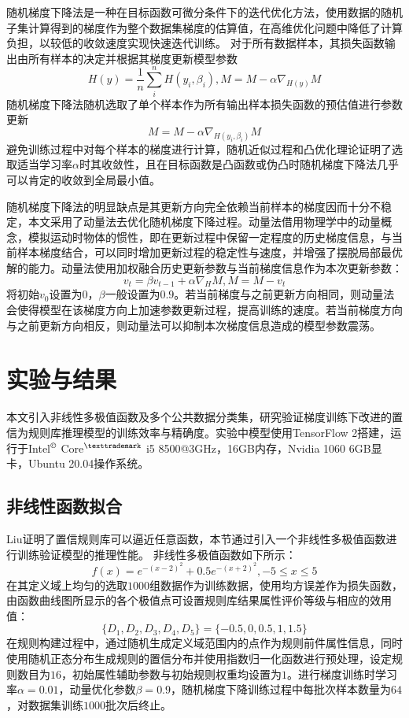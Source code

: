 \documentclass{cjc}
\begin{document}
随机梯度下降法\cite{a17}是一种在目标函数可微分条件下的迭代优化方法，使用数据的随机子集计算得到的梯度作为整个数据集梯度的估算值，在高维优化问题中降低了计算负担，以较低的收敛速度实现快速迭代训练。  
对于所有数据样本，其损失函数输出由所有样本的决定并根据其梯度更新模型参数
$$H(y)=\frac{1}{n}\sum_i^nH(y_i,\beta_i),M=M-\alpha\nabla_{H(y)}M$$
随机梯度下降法随机选取了单个样本作为所有输出样本损失函数的预估值进行参数更新
$$M=M-\alpha\nabla_{H(y_i,\beta_i)}M$$
避免训练过程中对每个样本的梯度进行计算，随机近似过程和凸优化理论\cite{a18}证明了选取适当学习率$\alpha$时其收敛性，且在目标函数是凸函数或伪凸时随机梯度下降法几乎可以肯定的收敛到全局最小值。

随机梯度下降法的明显缺点是其更新方向完全依赖当前样本的梯度因而十分不稳定，本文采用了动量法\cite{a19}去优化随机梯度下降过程。动量法借用物理学中的动量概念，模拟运动时物体的惯性，即在更新过程中保留一定程度的历史梯度信息，与当前样本梯度结合，可以同时增加更新过程的稳定性与速度，并增强了摆脱局部最优解的能力。动量法使用加权融合历史更新参数与当前梯度信息作为本次更新参数：
$$v_t=\beta v_{t-1}+\alpha\nabla_HM,M=M-v_t$$
将初始$v_0$设置为$0$，$\beta$一般设置为$0.9$。若当前梯度与之前更新方向相同，则动量法会使得模型在该梯度方向上加速参数更新过程，提高训练的速度。若当前梯度方向与之前更新方向相反，则动量法可以抑制本次梯度信息造成的模型参数震荡。
\section{实验与结果}
本文引入非线性多极值函数及多个公共数据分类集，研究验证梯度训练下改进的置信为规则库推理模型的训练效率与精确度。实验中模型使用TensorFlow 2搭建，运行于Intel$^{\copyright}$ Core$^{\texttrademark}$ i5 8500@3GHz，16GB内存，Nvidia 1060 6GB显卡，Ubuntu 20.04操作系统。
\subsection{非线性函数拟合}
Liu\cite{a15}证明了置信规则库可以逼近任意函数，本节通过引入一个非线性多极值函数进行训练验证模型的推理性能。  
非线性多极值函数如下所示：
$$f(x)=e^{-(x-2)^2}+0.5e^{-(x+2)^2},-5\leq x\leq 5$$
在其定义域上均匀的选取$1000$组数据作为训练数据，使用均方误差作为损失函数，由函数曲线图所显示的各个极值点可设置规则库结果属性评价等级与相应的效用值：
$$\{D_1,D_2,D_3,D_4,D_5\}=\{-0.5,0,0.5,1,1.5\}$$
在规则构建过程中，通过随机生成定义域范围内的点作为规则前件属性信息，同时使用随机正态分布生成规则的置信分布并使用指数归一化函数进行预处理，设定规则数目为$16$，初始属性辅助参数与初始规则权重均设置为$1$。进行梯度训练时学习率$\alpha=0.01$，动量优化参数$\beta=0.9$，随机梯度下降训练过程中每批次样本数量为$64$，对数据集训练$1000$批次后终止。
\end{document}
